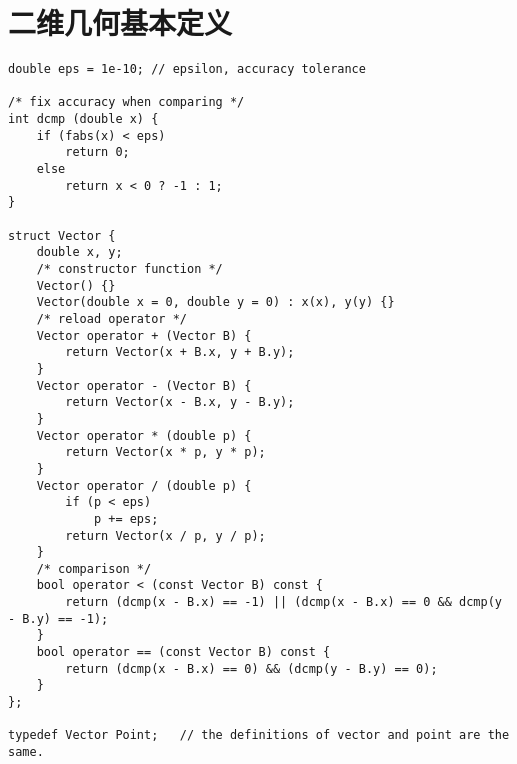 \section{二维几何基本定义}
\begin{verbatim}
double eps = 1e-10; // epsilon, accuracy tolerance

/* fix accuracy when comparing */
int dcmp (double x) {
    if (fabs(x) < eps)
        return 0;
    else
        return x < 0 ? -1 : 1;
}

struct Vector {
    double x, y;
    /* constructor function */
    Vector() {}
    Vector(double x = 0, double y = 0) : x(x), y(y) {}
    /* reload operator */
    Vector operator + (Vector B) {
        return Vector(x + B.x, y + B.y);
    }
    Vector operator - (Vector B) {
        return Vector(x - B.x, y - B.y);
    }
    Vector operator * (double p) {
        return Vector(x * p, y * p);
    }
    Vector operator / (double p) {
        if (p < eps)
            p += eps;
        return Vector(x / p, y / p);
    }
    /* comparison */
    bool operator < (const Vector B) const {
        return (dcmp(x - B.x) == -1) || (dcmp(x - B.x) == 0 && dcmp(y - B.y) == -1);
    }
    bool operator == (const Vector B) const {
        return (dcmp(x - B.x) == 0) && (dcmp(y - B.y) == 0);
    } 
}; 

typedef Vector Point;   // the definitions of vector and point are the same.
\end{verbatim}

